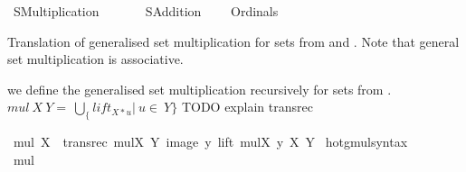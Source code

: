 %
\begin{isabellebody}%
%
%
\isadelimdocument
%
\endisadelimdocument
%
\isatagdocument
\isanewline
%
\isamarkuptrue%
%
\endisatagdocument
{\isafolddocument}%
%
\isadelimdocument
%
\endisadelimdocument
%
\isadelimtheory
%
\endisadelimtheory
%
\isatagtheory
{}\isamarkupfalse%
\ SMultiplication\isanewline
\ \ \isanewline
\ \ \ \ SAddition\isanewline
\ \ \ \ Ordinals\isanewline
{}%
\endisatagtheory
{\isafoldtheory}%
%
\isadelimtheory
%
\endisadelimtheory
%
\isadelimdocument
%
\endisadelimdocument
%
\isatagdocument
%
\isamarkuptrue%
%
\endisatagdocument
{\isafolddocument}%
%
\isadelimdocument
%
\endisadelimdocument
%
\begin{isamarkuptext}%
Translation of generalised set multiplication for sets from \cite{kirby_set_arithemtics}
and \cite{ZFC_in_HOL_AFP}. Note that general set multiplication is associative.%
\end{isamarkuptext}\isamarkuptrue%
%
\isadelimdocument
%
\endisadelimdocument
%
\isatagdocument
%
\isamarkuptrue%
%
\endisatagdocument
{\isafolddocument}%
%
\isadelimdocument
%
\endisadelimdocument
%
\begin{isamarkuptext}%
we define the generalised set multiplication recursively for sets from \cite{kirby_set_arithemtics}.
$mul\ X\ Y =\ \bigcup_\{lift_{X*u} |\ u \in\ Y\}$
TODO explain transrec%
\end{isamarkuptext}\isamarkuptrue%
\isamarkupfalse%
\ {\isachardoublequoteopen}mul\ X\ {\isasymequiv}\ transrec\ {\isacharparenleft}{\kern0pt}{\isasymlambda}mulX\ Y{\isachardot}{\kern0pt}\ {\isasymUnion}{\isacharparenleft}{\kern0pt}image\ {\isacharparenleft}{\kern0pt}{\isasymlambda}y{\isachardot}{\kern0pt}\ lift\ {\isacharparenleft}{\kern0pt}mulX\ y{\isacharparenright}{\kern0pt}\ X{\isacharparenright}{\kern0pt}\ Y{\isacharparenright}{\kern0pt}{\isacharparenright}{\kern0pt}{\isachardoublequoteclose}\isanewline
\isanewline
{}\isamarkupfalse%
\ hotg{\isacharunderscore}{\kern0pt}mul{\isacharunderscore}{\kern0pt}syntax\ \ \isamarkupfalse%
\ mul\ {\isacharparenleft}{\kern0pt}\ {\isachardoublequoteopen}{\isacharasterisk}{\kern0pt}{\isachardoublequoteclose}\ {}{}{\isacharparenright}{\kern0pt}\ \isamarkupfalse%
\isanewline
{}\isamarkupfalse%

\end{isabellebody}
